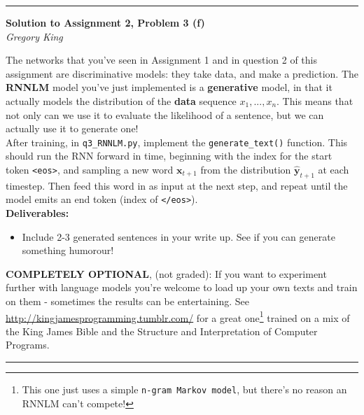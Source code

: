 \documentclass[letter,12pt]{article}
\newcommand{\myhwtitle}[3]
{\begin{center}
{\large {\bf Solution to Assignment {#1}, Problem {#2}}}\\
\medskip
{\it {#3}} %
\end{center}}
\newcommand{\solutionsAuthor}{Gregory King}
\begin{document}
\vspace{5mm}
\noindent\rule{\textwidth}{0.4pt}

\clearpage

\myhwtitle{2}{3 (f)}{\solutionsAuthor}

\bigskip

\noindent The networks that you've seen in Assignment 1 and in question 2 of this assignment are discriminative models: they take data, and make a prediction. The \textbf{RNNLM} model you've just implemented is a \textbf{generative} model, in that it actually models the distribution of the \textbf{data} sequence $x_{1}, ...,x_{n}$. This means that not only can we use it to evaluate the likelihood of a sentence, but we can actually use it to generate one! \\

\noindent After training, in \texttt{q3\_RNNLM.py}, implement the \texttt{generate\_text()} function. This should run the RNN forward in time, beginning with the index for the start token \texttt{<eos>}, and sampling a new word ${\boldsymbol x}_{t+1}$ from the distribution ${\hat{\boldsymbol y}}_{t+1}$ at each timestep. Then feed this word in as input at the next step, and repeat until the model emits an end token (index of \texttt{</eos>}).\\

{\Large \textbf{Deliverables:}}
\begin{itemize}
\item{Include 2-3 generated sentences in your write up. See if you can generate something humorour!}
\end{itemize}

\noindent\textbf{COMPLETELY OPTIONAL}, (not graded): If you want to experiment further with language models you're welcome to load up your own texts and train on them - sometimes the results can be entertaining. See \url{http://kingjamesprogramming.tumblr.com/} for a great one\footnote{This one just uses a simple \texttt{n-gram Markov model}, but there's no reason an RNNLM can't compete!} trained on a mix of the King James Bible and the Structure and Interpretation of Computer Programs.

\vspace{5mm}
\noindent\rule{\textwidth}{0.4pt}

\clearpage
\end{document}
